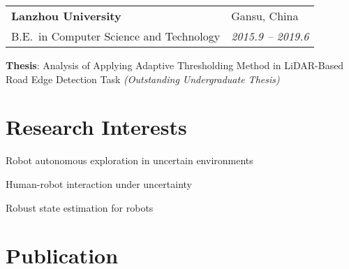 \documentclass[margin,line,pifont,palatino,courier]{res}
\newenvironment{list1}{
	\begin{list}{\ding{113}}{%
			\setlength{\itemsep}{0in}
			\setlength{\parsep}{0in} \setlength{\parskip}{0in}
			\setlength{\topsep}{0in} \setlength{\partopsep}{0in}
			\setlength{\leftmargin}{0.17in}}}{\end{list}}
\begin{document}
\begin{resume}
		\begin{tabular}{@{}p{3.9in}p{2.0in}}	
			{\bf Lanzhou University} & {\sc Gansu, China} \\
			B.E.~in Computer Science and Technology & {\sl 2015.9 -- 2019.6} \\
		\end{tabular}
		{\bf Thesis}: Analysis of Applying Adaptive Thresholding Method in LiDAR-Based Road Edge Detection Task {\it(Outstanding Undergraduate Thesis)}

		\section{\sc Research Interests}
		
		\begin{list1}
			\item Robot autonomous exploration in uncertain environments
			\item Human-robot interaction under uncertainty
			\item Robust state estimation for robots
		\end{list1}

		\section{\sc Publication}
		

\end{resume}
\end{document}
